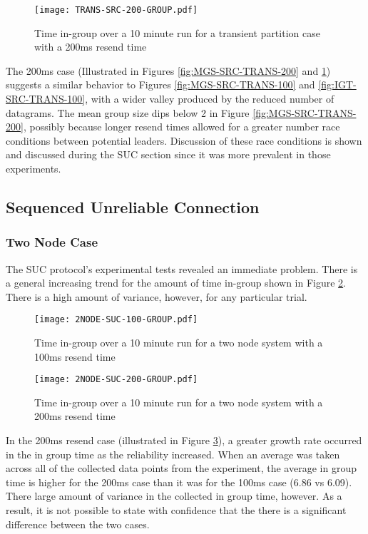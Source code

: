\begin{figure}[!h]
\centering
\texttt{[image: TRANS-SRC-200-GROUP.pdf]}
\caption{Time in-group over a 10 minute run for a transient partition case with a 200ms resend time}
\label{fig:IGT-SRC-TRANS-200}
\end{figure}

The 200ms case (Illustrated in Figures \ref{fig:MGS-SRC-TRANS-200} and \ref{fig:IGT-SRC-TRANS-200}) suggests a similar behavior to Figures \ref{fig:MGS-SRC-TRANS-100} and \ref{fig:IGT-SRC-TRANS-100}, with a wider valley produced by the reduced number of datagrams.
The mean group size dips below 2 in Figure \ref{fig:MGS-SRC-TRANS-200}, possibly because longer resend times allowed for a greater number race conditions between potential leaders.
Discussion of these race conditions is shown and discussed during the SUC section since it was more prevalent in those experiments.

\subsection{Sequenced Unreliable Connection}

\subsubsection{Two Node Case}

The SUC protocol's experimental tests revealed an immediate problem.
There is a general increasing trend for the amount of time in-group shown in Figure \ref{fig:IGT-SUC-2NODE-100}.
There is a high amount of variance, however, for any particular trial.

\begin{figure}[!h]
\centering
\texttt{[image: 2NODE-SUC-100-GROUP.pdf]}
\caption{Time in-group over a 10 minute run for a two node system with a 100ms resend time}
\label{fig:IGT-SUC-2NODE-100}
\end{figure}

\begin{figure}[!h]
\centering
\texttt{[image: 2NODE-SUC-200-GROUP.pdf]}
\caption{Time in-group over a 10 minute run for a two node system with a 200ms resend time}
\label{fig:IGT-SUC-2NODE-200}
\end{figure}

In the 200ms resend case (illustrated in Figure \ref{fig:IGT-SUC-2NODE-200}), a greater growth rate occurred in the in group time as the reliability increased.
When an average was taken across all of the collected data points from the experiment, the average in group time is higher for the 200ms case than it was for the 100ms case (6.86 vs 6.09).
There large amount of variance in the collected in group time, however.
As a result, it is not possible to state with confidence that the there is a significant difference between the two cases.

